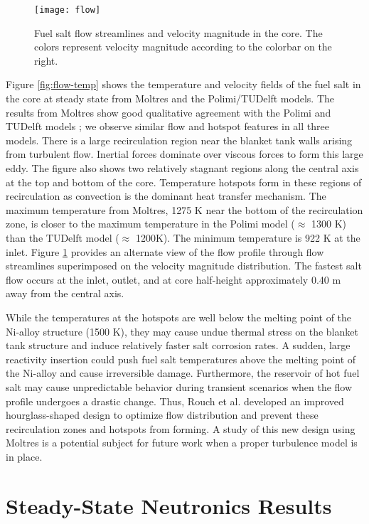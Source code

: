 \begin{figure}[t!]
    \centering
    \texttt{[image: flow]}
    \caption{Fuel salt flow streamlines and velocity magnitude in the core.
    The colors represent velocity magnitude according to the colorbar on the
    right.}
    \label{fig:flow}
\end{figure}

Figure \ref{fig:flow-temp} shows the temperature and velocity fields of the
fuel salt in the core at steady state from Moltres and the Polimi/TUDelft
models. The results from Moltres show good qualitative agreement with the
Polimi and TUDelft models \cite{aufiero_development_2014}; we observe similar
flow and hotspot features in all three models. There is a large recirculation
region near the blanket tank walls arising from turbulent flow. Inertial
forces dominate over viscous forces to form this large eddy. The figure also
shows two relatively stagnant regions along the central axis at the top and
bottom of the core. Temperature hotspots form in these regions of
recirculation as convection is
the dominant heat transfer mechanism. The maximum temperature from Moltres,
1275 K near the bottom of the recirculation zone, is closer to the maximum
temperature in the Polimi model ($\approx$ 1300 K) than the TUDelft model
($\approx$ 1200K). The minimum temperature is 922 K at the inlet. Figure
\ref{fig:flow} provides an alternate view of the flow profile through flow
streamlines superimposed on the velocity magnitude distribution. The fastest
salt flow occurs at the inlet, outlet, and at core half-height approximately
0.40 m away from the central axis.

While the temperatures at the hotspots are well below the melting point of the
Ni-alloy structure (1500 K), they may cause undue thermal stress on the
blanket tank structure and induce relatively faster salt corrosion rates. A
sudden, large reactivity insertion could push fuel salt temperatures above the
melting point of the Ni-alloy and cause irreversible damage. Furthermore,
the reservoir of hot fuel salt may cause unpredictable behavior during
transient scenarios when the flow profile undergoes a drastic change.
Thus, Rouch et al. \cite{rouch_preliminary_2014} developed an improved
hourglass-shaped design to optimize flow distribution and prevent these
recirculation zones and hotspots from forming. A study of this new design
using Moltres is a potential subject for future work when a proper turbulence
model is in place.

\section{Steady-State Neutronics Results}

